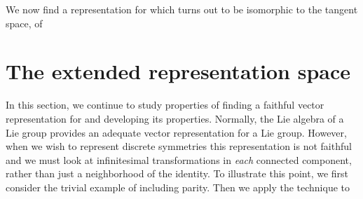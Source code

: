 \documentclass[a4paper,12pt]{article}
\begin{document}
We now find a representation for \coordHE{} which turns out to be
isomorphic to the tangent space, \coordHE{} of \coordHE{}

\section{The extended representation space}

In this section, we continue to study properties of \coordHE{}
finding a faithful vector representation for \coordHE{} and
developing its properties. Normally, the Lie algebra of a Lie group provides
an adequate vector representation for a Lie group. However, when we wish to
represent discrete symmetries this representation is not faithful and we
must look at infinitesimal transformations in \textit{each }connected
component, rather than just a neighborhood of the identity. To illustrate
this point, we first consider the trivial example of \coordHE{} including
parity. Then we apply the technique to \coordHE{}
\end{document}
